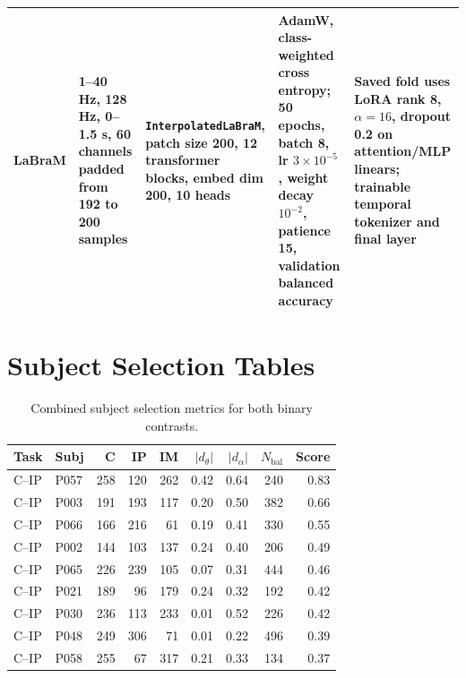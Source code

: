 \documentclass[11pt,a4paper,chapterprefix=false,parskip=false]{scrreprt}
\begin{document}
\begin{appendices}
\begin{table}[H]
\begin{tabularx}{\textwidth}{@{}lXXXX@{}}
            LaBraM       & 1--40 Hz, 128 Hz, 0--1.5 s, 60 channels padded from 192 to 200 samples                                                                & \texttt{InterpolatedLaBraM}, patch size 200, 12 transformer blocks, embed dim 200, 10 heads & AdamW, class-weighted cross entropy; 50 epochs, batch 8, lr $3 \times 10^{-5}$, weight decay $10^{-2}$, patience 15, validation balanced accuracy & Saved fold uses LoRA rank 8, $\alpha=16$, dropout 0.2 on attention/MLP linears; trainable temporal tokenizer and final layer \\
            \bottomrule
        \end{tabularx}
    \end{table}

    \chapter{Subject Selection Tables}
    \label{app:subject-selection}
    \begin{longtable}{@{}llrrrrrrr@{}}
        \caption{Combined subject selection metrics for both binary contrasts.}                    \\
        \toprule
        Task   & Subj & C   & IP  & IM  & $|d_\theta|$ & $|d_\alpha|$ & $N_{\mathrm{bal}}$ & Score \\
        \midrule
        \endhead
        \bottomrule
        \endfoot
        C--IP  & P057 & 258 & 120 & 262 & 0.42         & 0.64         & 240                & 0.83  \\
        C--IP  & P003 & 191 & 193 & 117 & 0.20         & 0.50         & 382                & 0.66  \\
        C--IP  & P066 & 166 & 216 & 61  & 0.19         & 0.41         & 330                & 0.55  \\
        C--IP  & P002 & 144 & 103 & 137 & 0.24         & 0.40         & 206                & 0.49  \\
        C--IP  & P065 & 226 & 239 & 105 & 0.07         & 0.31         & 444                & 0.46  \\
        C--IP  & P021 & 189 & 96  & 179 & 0.24         & 0.32         & 192                & 0.42  \\
        C--IP  & P030 & 236 & 113 & 233 & 0.01         & 0.52         & 226                & 0.42  \\
        C--IP  & P048 & 249 & 306 & 71  & 0.01         & 0.22         & 496                & 0.39  \\
        C--IP  & P058 & 255 & 67  & 317 & 0.21         & 0.33         & 134                & 0.37  \\

\end{longtable}
\end{appendices}
\end{document}
